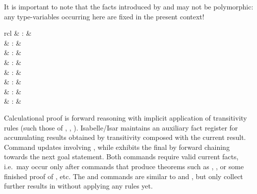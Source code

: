 \begin{isabellebody}
\begin{isamarkuptext}
  It is important to note that the facts introduced by \mbox{} and \mbox{} may not be polymorphic: any
  type-variables occurring here are fixed in the present context!%
\end{isamarkuptext}%
\isamarkuptrue%
%
\isamarkuptrue%
%
\begin{isamarkuptext}%
\begin{matharray}{rcl}
    \mbox{} & : &  \\
    \mbox{} & : &  \\
    \mbox{} & : &  \\
    \mbox{} & : &  \\
    \mbox{}\isa{{\isachardoublequote}\isactrlsup {\isacharasterisk}{\isachardoublequote}} & : &  \\
    \mbox{} & : & \isaratt \\
    \mbox{} & : & \isaratt \\
    \mbox{} & : & \isaratt \\
  \end{matharray}

  Calculational proof is forward reasoning with implicit application
  of transitivity rules (such those of \isa{{\isachardoublequote}{\isacharequal}{\isachardoublequote}}, \isa{{\isachardoublequote}{\isasymle}{\isachardoublequote}},
  \isa{{\isachardoublequote}{\isacharless}{\isachardoublequote}}).  Isabelle/Isar maintains an auxiliary fact register
  \mbox{} for accumulating results obtained by
  transitivity composed with the current result.  Command \mbox{} updates \mbox{} involving \mbox{}, while
  \mbox{} exhibits the final \mbox{} by
  forward chaining towards the next goal statement.  Both commands
  require valid current facts, i.e.\ may occur only after commands
  that produce theorems such as \mbox{}, \mbox{}, or some finished proof of \mbox{}, \mbox{} etc.  The \mbox{} and \mbox{}
  commands are similar to \mbox{} and \mbox{},
  but only collect further results in \mbox{} without
  applying any rules yet.


\end{isamarkuptext}
\end{isabellebody}
